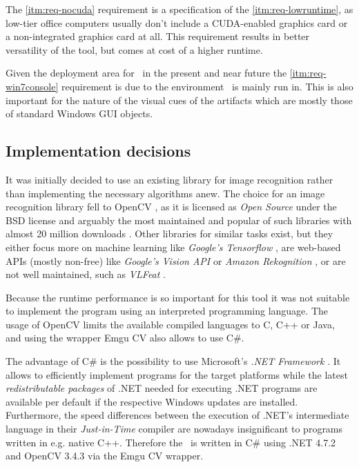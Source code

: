 The \ref{itm:req-nocuda} requirement is a specification of the \ref{itm:req-lowruntime}, as low-tier office computers usually don't include a CUDA-enabled graphics card or a non-integrated graphics card at all. This requirement results in better versatility of the tool, but comes at cost of a higher runtime.

Given the deployment area for \ape~in the present and near future the \ref{itm:req-win7console} requirement is due to the environment \ape~is mainly run in. This is also important for the nature of the visual cues of the artifacts which are mostly those of standard Windows GUI objects.

\subsection{Implementation decisions}

It was initially decided to use an existing library for image recognition rather than implementing the necessary algorithms anew. The choice for an image recognition library fell to OpenCV \cite{opencv}, as it is licensed as \emph{Open Source} under the BSD license and arguably the most maintained and popular of such libraries with almost 20 million downloads \cite{opencv_downloads}. Other libraries for similar tasks exist, but they either focus more on machine learning like \emph{Google's Tensorflow} \cite{tensorflow}, are web-based APIs (mostly non-free) like \emph{Google's Vision API} \cite{vision_api} or \emph{Amazon Rekognition} \cite{rekognition}, or are not well maintained, such as \emph{VLFeat} \cite{vlfeat}.

Because the runtime performance is so important for this tool it was not suitable to implement the program using an interpreted programming language. The usage of OpenCV limits the available compiled languages to C, C++ or Java, and using the wrapper Emgu CV also allows to use C\#.

The advantage of C\# is the possibility to use Microsoft's \emph{.NET Framework} \cite{dotnet4_7_2}. It allows to efficiently implement programs for the target platforms while the latest \emph{redistributable packages} of .NET needed for executing .NET programs are available per default if the respective Windows updates are installed. Furthermore, the speed differences between the execution of .NET's intermediate language in their \emph{Just-in-Time} compiler are nowadays insignificant to programs written in e.g. native C++. Therefore the \vd~is written in C\# using .NET 4.7.2 and OpenCV 3.4.3 via the Emgu CV wrapper.

